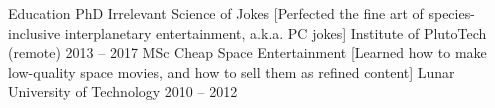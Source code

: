 \documentclass[
]{llresume}
\begin{document}
\makeheader

\begin{mainpane}
    \begin{mainsection}
        {Education} %
                \entryJob
                {PhD Irrelevant Science of Jokes} %
                [Perfected the fine art of species-inclusive interplanetary entertainment, a.k.a. PC jokes] %
                {Institute of PlutoTech (remote)} %
                {2013 -- 2017} %
                \entryJob
                {MSc Cheap Space Entertainment} %
                [Learned how to make low-quality space movies, and how to sell them as refined content] %
                {Lunar University of Technology} %
                {2010 -- 2012} %
    \end{mainsection}


\end{mainpane}
\end{document}
